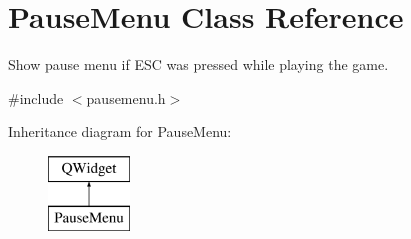 \hypertarget{class_pause_menu}{}\section{Pause\+Menu Class Reference}
\label{class_pause_menu}


Show pause menu if E\+SC was pressed while playing the game.  




{\ttfamily \#include $<$pausemenu.\+h$>$}

Inheritance diagram for Pause\+Menu\+:\begin{figure}[H]
\begin{center}
\leavevmode
\includegraphics[height=2.000000cm]{class_pause_menu}
\end{center}
\end{figure}
